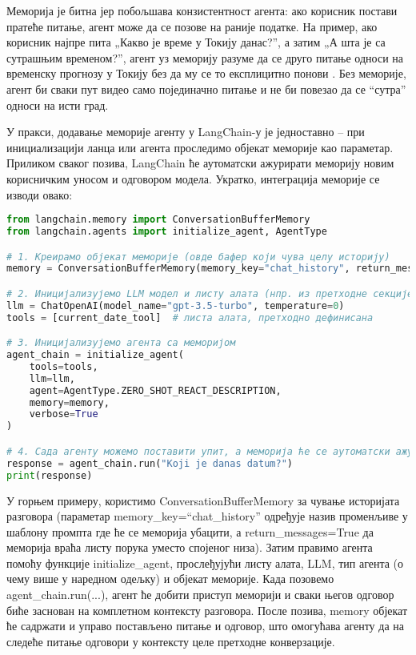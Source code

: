 Меморија је битна јер побољшава конзистентност агента: ако корисник постави пратеће питање, агент може да се позове на раније податке. На пример, ако корисник најпре пита „Какво је време у Токију данас?'', а затим „А шта је са сутрашњим временом?'', агент уз меморију разуме да се друго питање односи на временску прогнозу у Токију без да му се то експлицитно понови \cite{langchain_docs_2024}. Без меморије, агент би сваки пут видео само појединачно питање и не би повезао да се ``сутра'' односи на исти град.

У пракси, додавање меморије агенту у LangChain-у је једноставно -- при инициализацији ланца или агента проследимо објекат меморије као параметар. Приликом сваког позива, LangChain ће аутоматски ажурирати меморију новим корисничким уносом и одговором модела. Укратко, интеграција меморије се изводи овако:

\begin{lstlisting}[language=Python, caption={Креирање агента са меморијом}]
from langchain.memory import ConversationBufferMemory
from langchain.agents import initialize_agent, AgentType

# 1. Креирамо објекат меморије (овде бафер који чува целу историју)
memory = ConversationBufferMemory(memory_key="chat_history", return_messages=True)

# 2. Иницијализујемо LLM модел и листу алата (нпр. из претходне секције)
llm = ChatOpenAI(model_name="gpt-3.5-turbo", temperature=0)
tools = [current_date_tool]  # листа алата, претходно дефинисана

# 3. Иницијализујемо агента са меморијом
agent_chain = initialize_agent(
    tools=tools,
    llm=llm,
    agent=AgentType.ZERO_SHOT_REACT_DESCRIPTION,
    memory=memory,
    verbose=True
)

# 4. Сада агенту можемо поставити упит, а меморија ће се аутоматски ажурирати
response = agent_chain.run("Koji je danas datum?")
print(response)
\end{lstlisting}

У горњем примеру, користимо ConversationBufferMemory за чување историјата разговора (параметар memory\_key=``chat\_history'' одређује назив променљиве у шаблону промпта где ће се меморија убацити, а return\_messages=True да меморија враћа листу порука уместо спојеног низа). Затим правимо агента помоћу функције initialize\_agent, прослеђујући листу алата, LLM, тип агента (о чему више у наредном одељку) и објекат меморије. Када позовемо agent\_chain.run(...), агент ће добити приступ меморији и сваки његов одговор биће заснован на комплетном контексту разговора. После позива, memory објекат ће садржати и управо постављено питање и одговор, што омогућава агенту да на следеће питање одговори у контексту целе претходне конверзације.

